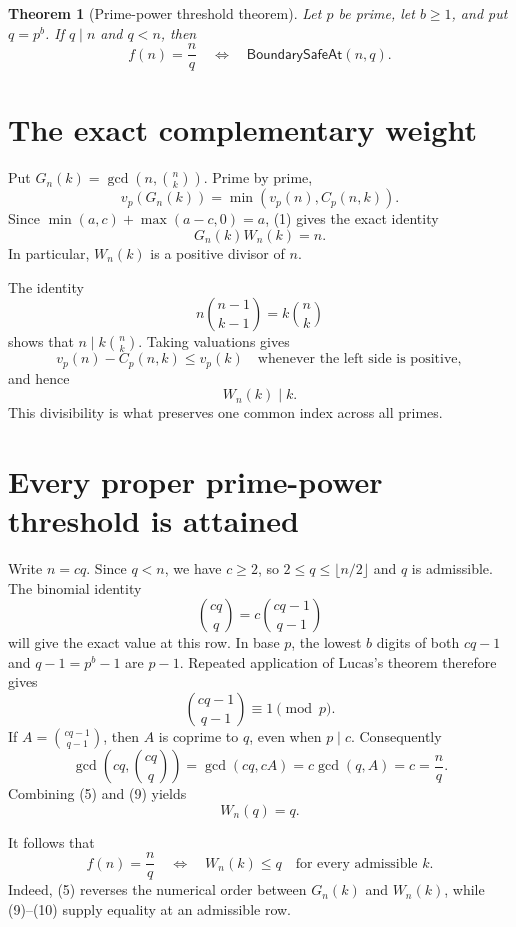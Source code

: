 \documentclass[11pt]{article}
\newtheorem{theorem}{Theorem}
\theoremstyle{remark}
\newcommand{\choosef}[2]{\binom{#1}{#2}}
\newcommand{\BoundarySafeAt}{\mathsf{BoundarySafeAt}}
\begin{document}
\begin{theorem}[Prime-power threshold theorem]\label{thm:threshold}
Let $p$ be prime, let $b\geq1$, and put $q=p^b$.  If $q\mid n$ and $q<n$,
then
\[
 \boxed{
 f(n)=\frac nq
 \quad\Longleftrightarrow\quad
 \BoundarySafeAt(n,q).}
\]
\end{theorem}

\section{The exact complementary weight}

Put $G_n(k)=\gcd(n,\choosef nk)$.  Prime by prime,
\[
 v_p(G_n(k))=\min\!\left(v_p(n),C_p(n,k)\right).
\]
Since $\min(a,c)+\max(a-c,0)=a$, (1) gives the exact identity
\[
 \boxed{G_n(k)W_n(k)=n.}                                  \tag{5}
\]
In particular, $W_n(k)$ is a positive divisor of $n$.

The identity
\[
 n\choosef{n-1}{k-1}=k\choosef nk
\]
shows that $n\mid k\choosef nk$.  Taking valuations gives
\[
 v_p(n)-C_p(n,k)\leq v_p(k)
 \quad\text{whenever the left side is positive},
\]
and hence
\[
 \boxed{W_n(k)\mid k.}                                    \tag{6}
\]
This divisibility is what preserves one common index across all primes.

\section{Every proper prime-power threshold is attained}

Write $n=cq$.  Since $q<n$, we have $c\geq2$, so
$2\leq q\leq\lfloor n/2\rfloor$ and $q$ is admissible.  The binomial
identity
\[
 \choosef{cq}{q}=c\choosef{cq-1}{q-1}                    \tag{7}
\]
will give the exact value at this row.  In base $p$, the lowest $b$ digits
of both $cq-1$ and $q-1=p^b-1$ are $p-1$.  Repeated application of Lucas's
theorem therefore gives
\[
 \choosef{cq-1}{q-1}\equiv1\pmod p.                       \tag{8}
\]
If $A=\choosef{cq-1}{q-1}$, then $A$ is coprime to $q$, even when $p\mid c$.
Consequently
\[
 \gcd\!\left(cq,\choosef{cq}{q}\right)
 =\gcd(cq,cA)=c\gcd(q,A)=c=\frac nq.                      \tag{9}
\]
Combining (5) and (9) yields
\[
 W_n(q)=q.                                                  \tag{10}
\]

It follows that
\[
 f(n)=\frac nq
 \quad\Longleftrightarrow\quad
 W_n(k)\leq q\quad\text{for every admissible }k.           \tag{11}
\]
Indeed, (5) reverses the numerical order between $G_n(k)$ and $W_n(k)$,
while (9)--(10) supply equality at an admissible row.
\end{document}
